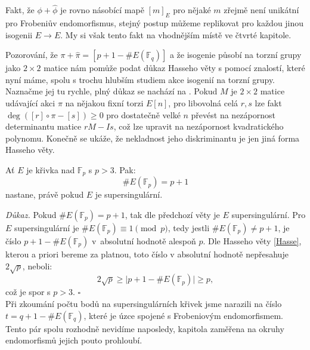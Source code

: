 \documentclass[12pt]{report}
\begin{document}
\begin{poznamka}
Fakt, že $\phi+\widehat{\phi}$ je rovno násobící mapě $[m]_E$ pro nějaké $m$ zřejmě není unikátní pro Frobeniův endomorfismus, stejný postup můžeme replikovat pro každou jinou isogenii $E \longrightarrow E$. My si však tento fakt  na vhodnějším místě ve čtvrté kapitole. 
\end{poznamka}

\begin{poznamka}
Pozorování, že $\pi+\widehat{\pi} = [p+1-\#E(\mathbb{F}_q)]$ a že isogenie působí na torzní grupy jako $2 \times 2$ matice nám pomůže podat důkaz Hasseho věty s pomocí znalostí, které nyní máme, spolu s trochu hlubším studiem akce isogenií na torzní grupy. Naznačme jej tu rychle, plný důkaz se nachází na \cite[Thm. 8.1, Thm. 7.17]{Sutherland}. Pokud $M$ je $2 \times 2$ matice udávající akci $\pi$ na nějakou fixní torzi $E[n]$, pro libovolná celá $r,s$ lze fakt $\deg ([r] \circ \pi -[s]) \geqslant 0$ pro dostatečně velké $n$ převést na nezápornost determinantu matice $r M - I s$, což lze upravit na nezápornost kvadratického polynomu. Konečně se ukáže, že nekladnost jeho diskriminantu je jen jiná forma Hasseho věty.
\end{poznamka}

\begin{dusledek}\label{super2}
Ať $E$ je křivka nad $\mathbb{F}_p$ s $p > 3$. Pak: $$\# E(\mathbb{F}_p) = p+1$$  nastane, právě pokud $E$ je supersingulární.
\end{dusledek}

\noindent \textit{Důkaz.} Pokud $\# E(\mathbb{F}_p) = p+1$, tak dle předchozí věty je $E$ supersingulární. Pro $E$ supersingulární je $\# E(\mathbb{F}_p) \equiv 1 \pmod{p}$, tedy jestli $\# E(\mathbb{F}_p) \neq p+1$, je číslo $p+1 - \# E(\mathbb{F}_p)$ v~absolutní hodnotě alespoň $p$. Dle Hasseho věty \ref{Hasse}, kterou a priori bereme za platnou, toto číslo v absolutní hodnotě nepřesahuje $2\sqrt{p}$, neboli:
\begin{equation*}
2\sqrt{p} \geqslant \vert p+1 - \# E(\mathbb{F}_p)\vert \geqslant p,
\end{equation*}
což je spor s $p > 3$. \hfill $\square$\\

Při zkoumání počtu bodů na supersingulárních křivek jsme narazili na číslo $t = q+1 - \# E(\mathbb{F}_q)$, které je úzce spojené s Frobeniovým endomorfismem. Tento pár spolu rozhodně nevidíme naposledy, kapitola zaměřena na okruhy endomorfismů jejich pouto prohloubí.
\end{document}
